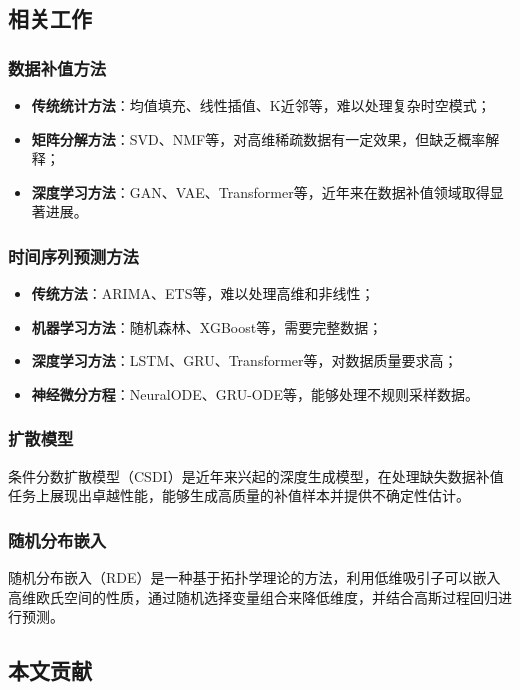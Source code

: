 \documentclass[12pt,a4paper]{article}
\begin{document}
\subsection{相关工作}

\subsubsection{数据补值方法}
\begin{itemize}
    \item \textbf{传统统计方法}：均值填充、线性插值、K近邻等，难以处理复杂时空模式；
    \item \textbf{矩阵分解方法}：SVD、NMF等，对高维稀疏数据有一定效果，但缺乏概率解释；
    \item \textbf{深度学习方法}：GAN、VAE、Transformer等，近年来在数据补值领域取得显著进展。
\end{itemize}

\subsubsection{时间序列预测方法}
\begin{itemize}
    \item \textbf{传统方法}：ARIMA、ETS等，难以处理高维和非线性；
    \item \textbf{机器学习方法}：随机森林、XGBoost等，需要完整数据；
    \item \textbf{深度学习方法}：LSTM、GRU、Transformer等，对数据质量要求高；
    \item \textbf{神经微分方程}：NeuralODE、GRU-ODE等，能够处理不规则采样数据。
\end{itemize}

\subsubsection{扩散模型}
条件分数扩散模型（CSDI）是近年来兴起的深度生成模型，在处理缺失数据补值任务上展现出卓越性能，能够生成高质量的补值样本并提供不确定性估计。

\subsubsection{随机分布嵌入}
随机分布嵌入（RDE）是一种基于拓扑学理论的方法，利用低维吸引子可以嵌入高维欧氏空间的性质，通过随机选择变量组合来降低维度，并结合高斯过程回归进行预测。

\subsection{本文贡献}
\end{document}
